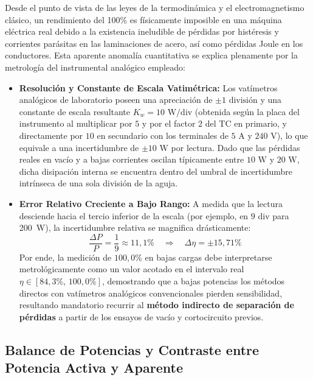 \begin{enumerate}
    Desde el punto de vista de las leyes de la termodinámica y el electromagnetismo clásico, un rendimiento del 100\% es físicamente imposible en una máquina eléctrica real debido a la existencia ineludible de pérdidas por histéresis y corrientes parásitas en las laminaciones de acero, así como pérdidas Joule en los conductores. Esta aparente anomalía cuantitativa se explica plenamente por la metrología del instrumental analógico empleado:
    \begin{itemize}
        \item \textbf{Resolución y Constante de Escala Vatimétrica:} Los vatímetros analógicos de laboratorio poseen una apreciación de $\pm 1\text{ división}$ y una constante de escala resultante $K_w = 10\text{ W/div}$ (obtenida según la placa del instrumento al multiplicar por $5$ y por el factor $2$ del TC en primario, y directamente por $10$ en secundario con los terminales de $5\text{ A}$ y $240\text{ V}$), lo que equivale a una incertidumbre de $\pm 10\text{ W}$ por lectura. Dado que las pérdidas reales en vacío y a bajas corrientes oscilan típicamente entre $10\text{ W}$ y $20\text{ W}$, dicha disipación interna se encuentra dentro del umbral de incertidumbre intrínseca de una sola división de la aguja.
        \item \textbf{Error Relativo Creciente a Bajo Rango:} A medida que la lectura desciende hacia el tercio inferior de la escala (por ejemplo, en $9\text{ div}$ para 200~W), la incertidumbre relativa se magnifica drásticamente:
        \begin{equation}
            \frac{\Delta P}{P} = \frac{1}{9} \approx 11{,}1\% \quad \Longrightarrow \quad \Delta \eta = \pm 15{,}71\%
        \end{equation}
        Por ende, la medición de $100{,}0\%$ en bajas cargas debe interpretarse metrológicamente como un valor acotado en el intervalo real $\eta \in [84{,}3\%,\, 100{,}0\%]$, demostrando que a bajas potencias los métodos directos con vatímetros analógicos convencionales pierden sensibilidad, resultando mandatorio recurrir al \textbf{método indirecto de separación de pérdidas} a partir de los ensayos de vacío y cortocircuito previos.
    \end{itemize}
\end{enumerate}

\subsection{Balance de Potencias y Contraste entre Potencia Activa y Aparente}

